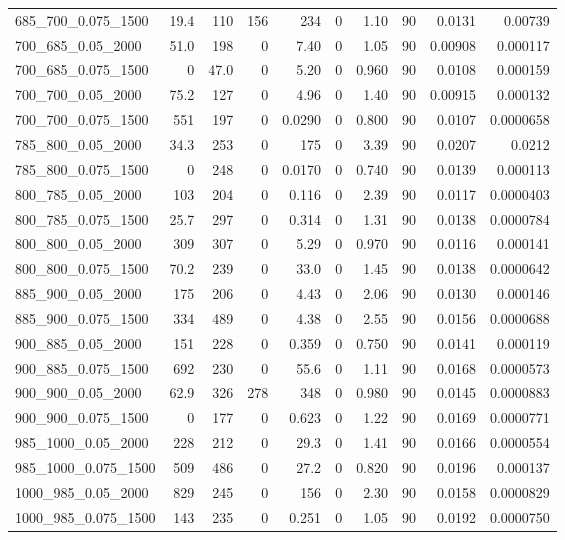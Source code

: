 \begin{landscape}
\begin{longtable}{lrrrrrrrrr}
685\_700\_0.075\_1500 & 19.4 & 110 & 156 & 234 & 0 & 1.10 & 90 & 0.0131 & 0.00739\\
700\_685\_0.05\_2000 & 51.0 & 198 & 0 & 7.40 & 0 & 1.05 & 90 & 0.00908 & 0.000117\\
700\_685\_0.075\_1500 & 0 & 47.0 & 0 & 5.20 & 0 & 0.960 & 90 & 0.0108 & 0.000159\\
700\_700\_0.05\_2000 & 75.2 & 127 & 0 & 4.96 & 0 & 1.40 & 90 & 0.00915 & 0.000132\\
700\_700\_0.075\_1500 & 551 & 197 & 0 & 0.0290 & 0 & 0.800 & 90 & 0.0107 & 0.0000658\\
785\_800\_0.05\_2000 & 34.3 & 253 & 0 & 175 & 0 & 3.39 & 90 & 0.0207 & 0.0212\\
785\_800\_0.075\_1500 & 0 & 248 & 0 & 0.0170 & 0 & 0.740 & 90 & 0.0139 & 0.000113\\
800\_785\_0.05\_2000 & 103 & 204 & 0 & 0.116 & 0 & 2.39 & 90 & 0.0117 & 0.0000403\\
800\_785\_0.075\_1500 & 25.7 & 297 & 0 & 0.314 & 0 & 1.31 & 90 & 0.0138 & 0.0000784\\
800\_800\_0.05\_2000 & 309 & 307 & 0 & 5.29 & 0 & 0.970 & 90 & 0.0116 & 0.000141\\
800\_800\_0.075\_1500 & 70.2 & 239 & 0 & 33.0 & 0 & 1.45 & 90 & 0.0138 & 0.0000642\\
885\_900\_0.05\_2000 & 175 & 206 & 0 & 4.43 & 0 & 2.06 & 90 & 0.0130 & 0.000146\\
885\_900\_0.075\_1500 & 334 & 489 & 0 & 4.38 & 0 & 2.55 & 90 & 0.0156 & 0.0000688\\
900\_885\_0.05\_2000 & 151 & 228 & 0 & 0.359 & 0 & 0.750 & 90 & 0.0141 & 0.000119\\
900\_885\_0.075\_1500 & 692 & 230 & 0 & 55.6 & 0 & 1.11 & 90 & 0.0168 & 0.0000573\\
900\_900\_0.05\_2000 & 62.9 & 326 & 278 & 348 & 0 & 0.980 & 90 & 0.0145 & 0.0000883\\
900\_900\_0.075\_1500 & 0 & 177 & 0 & 0.623 & 0 & 1.22 & 90 & 0.0169 & 0.0000771\\
985\_1000\_0.05\_2000 & 228 & 212 & 0 & 29.3 & 0 & 1.41 & 90 & 0.0166 & 0.0000554\\
985\_1000\_0.075\_1500 & 509 & 486 & 0 & 27.2 & 0 & 0.820 & 90 & 0.0196 & 0.000137\\
1000\_985\_0.05\_2000 & 829 & 245 & 0 & 156 & 0 & 2.30 & 90 & 0.0158 & 0.0000829\\
1000\_985\_0.075\_1500 & 143 & 235 & 0 & 0.251 & 0 & 1.05 & 90 & 0.0192 & 0.0000750\\

\end{longtable}
\end{landscape}
